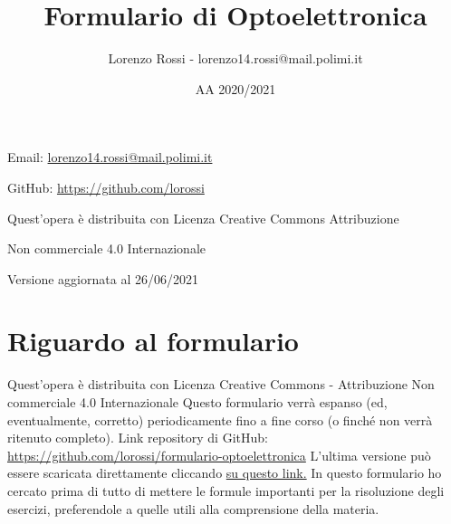 \documentclass{article}
\title{Formulario di Optoelettronica}
\author{Lorenzo Rossi - lorenzo14.rossi@mail.polimi.it}
\date{AA 2020/2021}
\begin{document}
\maketitle

\vspace{18em}

\large
\begin{doublespacing}\hypersetup{
    urlcolor=black,
  }
  \centerline{Email: \href{mailto://lorenzo14.rossi@mail.polimi.it}{lorenzo14.rossi@mail.polimi.it}}
  \centerline{GitHub: \url{https://github.com/lorossi}}

  \vspace{18em}
  \centerline{Quest'opera è distribuita con Licenza Creative Commons Attribuzione}
  \centerline{Non commerciale 4.0 Internazionale \ccbynceu}
  \centerline{Versione aggiornata al 26/06/2021}
\end{doublespacing}
\newpage


\tableofcontents
\clearpage
{}
\newpage

\section{Riguardo al formulario}
Quest'opera è distribuita con Licenza Creative Commons - Attribuzione Non commerciale 4.0 Internazionale \ccbynceu \newline
Questo formulario verrà espanso (ed, eventualmente, corretto) periodicamente fino a fine corso (o finché non verrà ritenuto completo). \newline
Link repository di GitHub: \url{https://github.com/lorossi/formulario-optoelettronica} \newline
L'ultima versione può essere scaricata direttamente cliccando \href{https://github.com/lorossi/formulario-optoelettronica/raw/master/formulario-optoelettronica.pdf}{su questo link.} \newline
In questo formulario ho cercato prima di tutto di mettere le formule importanti per la risoluzione degli esercizi, preferendole a quelle utili alla comprensione della materia.
\end{document}
